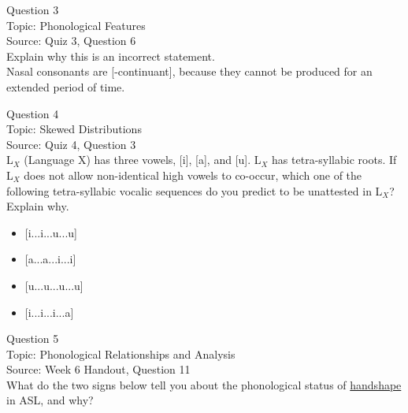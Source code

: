 \documentclass[12pt]{article}
\begin{document}
\newpage

{\large Question 3}\\

Topic: Phonological Features\\
Source: Quiz 3, Question 6\\

Explain why this is an incorrect statement.\\

Nasal consonants are {[-continuant]}, because they cannot be produced for an extended period of time.


\newpage

{\large Question 4}\\

Topic: Skewed Distributions\\
Source: Quiz 4, Question 3\\

L$_X$ (Language X) has three vowels, [i], [a], and [u]. L$_X$ has tetra-syllabic roots. If L$_X$ does not allow non-identical high vowels to co-occur, which one of the following tetra-syllabic vocalic sequences do you predict to be unattested in L$_X$? Explain why.\\

\begin{itemize} \item {[i...i...u...u]} \item {[a...a...i...i]} \item {[u...u...u...u]} \item {[i...i...i...a]} \end{itemize}


\newpage

{\large Question 5}\\

Topic: Phonological Relationships and Analysis\\
Source: Week 6 Handout, Question 11\\

What do the two signs below tell you about the phonological status of \underline{handshape} in ASL, and why?\\
\end{document}
